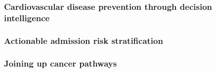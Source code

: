 \documentclass[
  letterpaper,
  DIV=11,
  numbers=noendperiod]{scrartcl}
\begin{document}
\subsubsection{Cardiovascular disease prevention through decision
intelligence}\label{cardiovascular-disease-prevention-through-decision-intelligence}

\subsubsection{Actionable admission risk
stratification}\label{actionable-admission-risk-stratification}

\subsubsection{Joining up cancer
pathways}\label{joining-up-cancer-pathways}

\subsubsection{}\label{section}
\end{document}
